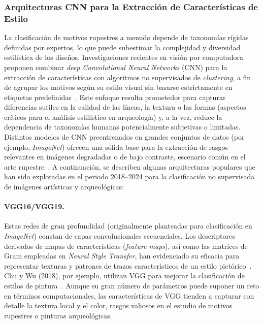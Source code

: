 \subsubsection{Arquitecturas CNN para la Extracción de Características de Estilo }
La clasificación de motivos rupestres a menudo depende de taxonomías rígidas definidas por expertos, lo que puede subestimar la complejidad y diversidad estilística de los diseños.
Investigaciones recientes en visión por computadora proponen combinar \textit{deep Convolutional Neural Networks} (CNN) para la extracción de características con algoritmos no supervisados de \textit{clustering}, a fin de agrupar los motivos según su estilo visual sin basarse estrictamente en etiquetas predefinidas~\cite{gairola2020}.
Este enfoque resulta prometedor para capturar diferencias sutiles en la calidad de las líneas, la textura o las formas (aspectos críticos para el análisis estilístico en arqueología) y, a la vez, reduce la dependencia de taxonomías humanas potencialmente subjetivas o limitadas.
Distintos modelos de CNN preentrenados en grandes conjuntos de datos (por ejemplo, \textit{ImageNet}) ofrecen una sólida base para la extracción de rasgos relevantes en imágenes degradadas o de bajo contraste, escenario común en el arte rupestre~\cite{guerin2018}.
A continuación, se describen algunas arquitecturas populares que han sido exploradas en el periodo 2018–2024 para la clasificación no supervisada de imágenes artísticas y arqueológicas:

\paragraph{VGG16/VGG19.}
Estas redes de gran profundidad (originalmente planteadas para clasificación en \textit{ImageNet}) constan de capas convolucionales secuenciales.
Los descriptores derivados de mapas de características (\textit{feature maps}), así como las matrices de Gram empleadas en \textit{Neural Style Transfer}, han evidenciado su eficacia para representar texturas y patrones de trazos característicos de un estilo pictórico~\cite{gairola2020}.
Chu y Wu (2018), por ejemplo, utilizan VGG para mejorar la clasificación de estilos de pintura~\cite{gairola2020}.
Aunque su gran número de parámetros puede suponer un reto en términos computacionales, las características de VGG tienden a capturar con detalle la textura local y el color, rasgos valiosos en el estudio de motivos rupestres o pinturas arqueológicas.

